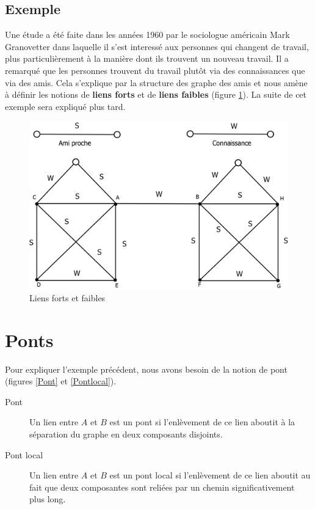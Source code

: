 \subsection*{Exemple}
Une étude a été faite dans les années 1960 par le sociologue américain Mark Granovetter dans laquelle il s'est interessé aux personnes qui changent de travail, plus particulièrement à la manière dont ils trouvent un nouveau travail. Il a remarqué que les personnes trouvent du travail plutôt via des connaissances que via des amis. Cela s'explique par la structure des graphe des amis et nous amène à définir les notions de \textbf{liens forts} et de \textbf{liens faibles} (figure \ref{liens_forts_et_faibles}). La suite de cet exemple sera expliqué plus tard.\\
	\begin{figure}[!h]
	\center
	\includegraphics[scale=0.4]{images/18_liens_forts_et_faibles.png}
	\caption{\label{liens_forts_et_faibles} Liens forts et faibles}
	\end{figure}

    
\section{Ponts}
Pour expliquer l'exemple précédent, nous avons besoin de la notion de pont (figures \ref{Pont} et \ref{Pontlocal}).
	\begin{description}
	\item[Pont] Un lien entre $A$ et $B$ est un pont si l'enlèvement de ce lien aboutit à la séparation du graphe en deux composants disjoints.
    \item[Pont local] Un lien entre $A$ et $B$ est un pont local si l'enlèvement de ce lien aboutit au fait que deux composantes sont reliées par un chemin significativement plus long.
    \end{description}
    
